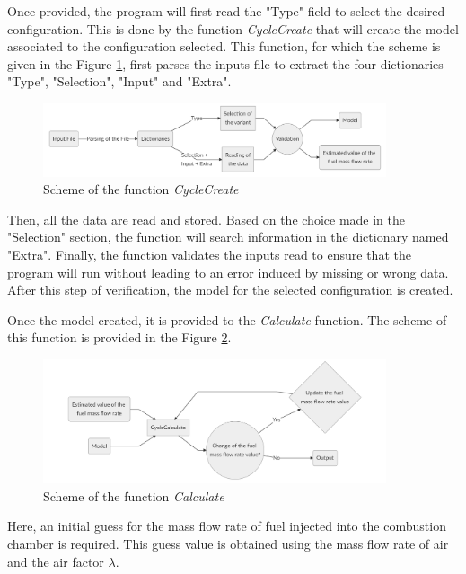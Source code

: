 Once provided, the program will first read the "Type" field to select the desired configuration. This is done by the function \textit{CycleCreate} that will create the model associated to the configuration selected. This function, for which the scheme is given in the Figure \ref{fig:C6_cyclecreate}, first parses the inputs file to extract the four dictionaries "Type", "Selection", "Input" and "Extra". 

\begin{figure}[h]
    \centering
    \includegraphics[width=0.9\textwidth]{Chapitre_6/Images/CycleCreate.png}
    \caption{Scheme of the function \textit{CycleCreate}}
    \label{fig:C6_cyclecreate}
\end{figure}
Then, all the data are read and stored. Based on the choice made in the "Selection" section, the function will search information in the dictionary named "Extra". 
Finally, the function validates the inputs read to ensure that the program will run without leading to an error induced by missing or wrong data. After this step of verification, the model for the selected configuration is created.

Once the model created, it is provided to the \textit{Calculate} function. The scheme of this function is provided in the Figure \ref{fig:C6_calculate}.

\begin{figure}[h]
    \centering
    \includegraphics[width=0.9\textwidth]{Chapitre_6/Images/Calculate.png}
    \caption{Scheme of the function \textit{Calculate}}
    \label{fig:C6_calculate}
\end{figure}

Here, an initial guess for the mass flow rate of fuel injected into the combustion chamber is required. This guess value is obtained using the mass flow rate of air and the air factor $\lambda$. 

